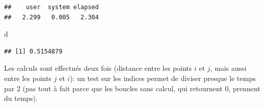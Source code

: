 \documentclass[
  12pt,
  french,
  a4paper,
  extrafontsizes,onecolumn,openright
  ]{memoir}
\newenvironment{Shaded}{\begin{snugshade}}{\end{snugshade}}
\newcommand{\AttributeTok}[1]{\textcolor[rgb]{0.13,0.29,0.53}{#1}}
\newcommand{\ControlFlowTok}[1]{\textcolor[rgb]{0.13,0.29,0.53}{\textbf{#1}}}
\newcommand{\DecValTok}[1]{\textcolor[rgb]{0.00,0.00,0.81}{#1}}
\newcommand{\FloatTok}[1]{\textcolor[rgb]{0.00,0.00,0.81}{#1}}
\newcommand{\FunctionTok}[1]{\textcolor[rgb]{0.13,0.29,0.53}{\textbf{#1}}}
\newcommand{\NormalTok}[1]{#1}
\newcommand{\OtherTok}[1]{\textcolor[rgb]{0.56,0.35,0.01}{#1}}
\newcommand{\SpecialCharTok}[1]{\textcolor[rgb]{0.81,0.36,0.00}{\textbf{#1}}}
\begin{document}
\begin{verbatim}
##    user  system elapsed 
##   2.299   0.005   2.304
\end{verbatim}

\begin{Shaded}
\begin{Highlighting}[]
\NormalTok{d}
\end{Highlighting}
\end{Shaded}

\begin{verbatim}
## [1] 0.5154879
\end{verbatim}

\normalsize

Les calculs sont effectués deux fois (distance entre les points \(i\) et \(j\), mais aussi entre les points \(j\) et \(i\)): un test sur les indices permet de diviser presque le temps par 2 (pas tout à fait parce que les boucles sans calcul, qui retournent \(0\), prennent du temps).

\scriptsize

\begin{Shaded}
\end{Shaded}
\end{document}
